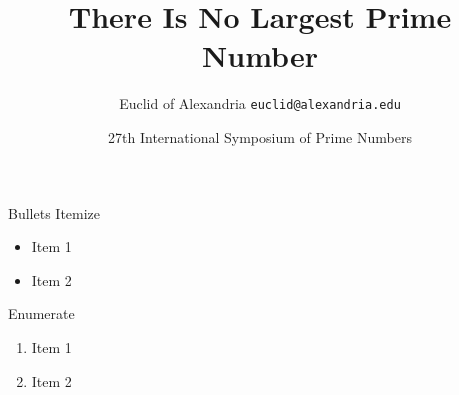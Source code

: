 \documentclass[t]{beamer}
\title{There Is No Largest Prime Number}
\date[ISPN ’80]{27th International Symposium of Prime Numbers}
\author[Euclid]{Euclid of Alexandria \texttt{euclid@alexandria.edu}}
\begin{document}
\begin{frame}
\titlepage
\end{frame}

\begin{frame}{Bullets}
    Itemize
    \begin{itemize}
        \item Item 1
        \item Item 2
    \end{itemize}
    Enumerate
    \begin{enumerate}
        \item Item 1
        \item Item 2
    \end{enumerate}
\end{frame}
\end{document}
